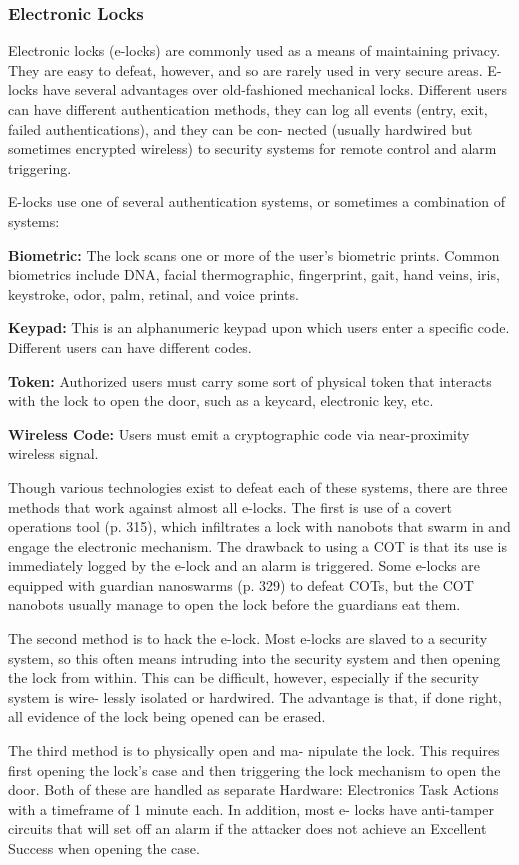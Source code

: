 \subsubsection{Electronic Locks}

Electronic locks (e-locks) are commonly used as a 
means of maintaining privacy. They are easy to defeat, 
however, and so are rarely used in very secure areas. 
E-locks have several advantages over old-fashioned 
mechanical locks. Different users can have different 
authentication methods, they can log all events (entry, 
exit, failed authentications), and they can be con-
nected (usually hardwired but sometimes encrypted 
wireless) to security systems for remote control and 
alarm triggering.

E-locks use one of several authentication systems, 
or sometimes a combination of systems:

\textbf{Biometric:} The lock scans one or more of the user's 
biometric prints. Common biometrics include DNA, 
facial thermographic, fingerprint, gait, hand veins, iris, 
keystroke, odor, palm, retinal, and voice prints.

\textbf{Keypad:} This is an alphanumeric keypad upon 
which users enter a specific code. Different users can 
have different codes.

\textbf{Token:} Authorized users must carry some sort of 
physical token that interacts with the lock to open the 
door, such as a keycard, electronic key, etc.

\textbf{Wireless Code:} Users must emit a cryptographic 
code via near-proximity wireless signal.

Though various technologies exist to defeat each 
of these systems, there are three methods that work 
against almost all e-locks. The first is use of a covert 
operations tool (p. 315), which infiltrates a lock with 
nanobots that swarm in and engage the electronic 
mechanism. The drawback to using a COT is that its 
use is immediately logged by the e-lock and an alarm 
is triggered. Some e-locks are equipped with guardian 
nanoswarms (p. 329) to defeat COTs, but the COT 
nanobots usually manage to open the lock before the 
guardians eat them.

The second method is to hack the e-lock. Most 
e-locks are slaved to a security system, so this often 
means intruding into the security system and then 
opening the lock from within. This can be difficult, 
however, especially if the security system is wire-
lessly isolated or hardwired. The advantage is that, 
if done right, all evidence of the lock being opened 
can be erased.

The third method is to physically open and ma-
nipulate the lock. This requires first opening the 
lock's case and then triggering the lock mechanism 
to open the door. Both of these are handled as 
separate Hardware: Electronics Task Actions with 
a timeframe of 1 minute each. In addition, most e-
locks have anti-tamper circuits that will set off an 
alarm if the attacker does not achieve an Excellent 
Success when opening the case.
